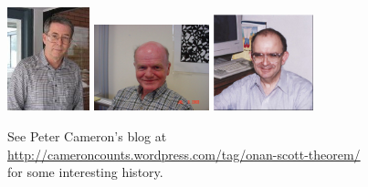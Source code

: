 
\begin{frame}[fragile,label=OSTheorem]{}
  \begin{center}
  \includegraphics[height=30mm]{aux/Aschbacher3}\hskip1cm
\includegraphics[height=25mm]{aux/ONan}\hskip1cm
\includegraphics[height=28mm]{aux/Scott}
  \end{center}
See Peter Cameron's blog at\\[6pt]
 {\small  \url{http://cameroncounts.wordpress.com/tag/onan-scott-theorem/}}\\[6pt]
 for some interesting history.
\end{frame}



